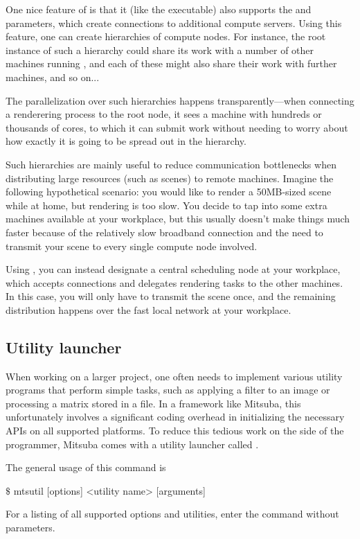One nice feature of  is that it (like the  executable)
also supports the  and  parameters, which create connections
to additional compute servers.
Using this feature, one can create hierarchies of compute nodes. For instance,
the root  instance of such a hierarchy could share its work with a
number of other  machines running , and each of these might also
share their work with further machines, and so on...

The parallelization over such hierarchies happens transparently---when
connecting a renderering process to the root node, it sees a machine
with hundreds or thousands of cores, to which it can submit work without
needing to worry about how exactly it is going to be spread out in
the hierarchy.

Such hierarchies are mainly useful to reduce communication bottlenecks when distributing
large resources (such as scenes) to remote machines. Imagine the following hypothetical scenario:
you would like to render a 50MB-sized scene while at home, but rendering is too slow.
You decide to tap into some extra machines available
at your workplace, but this usually doesn't make things much faster because of the relatively slow broadband
connection and the need to transmit your scene to every single compute node involved.

Using , you can
instead designate a central scheduling node at your workplace, which accepts connections and delegates
rendering tasks to the other machines. In this case, you will only have to transmit the scene once,
and the remaining distribution happens over the fast local network at your workplace.
\subsection{Utility launcher}
\label{sec:mtsutil}
When working on a larger project, one often needs to implement various utility programs that
perform simple tasks, such as applying a filter to an image or processing
a matrix stored in a file. In a framework like Mitsuba, this unfortunately involves
a significant coding overhead in initializing the necessary APIs on all supported platforms.
To reduce this tedious work on the side of the programmer, Mitsuba comes with a utility launcher
called .

The general usage of this command is
\begin{shell}
$\texttt{\$}$ mtsutil [options] <utility name> [arguments]
\end{shell}
For a listing of all supported options and utilities, enter the command without parameters.

